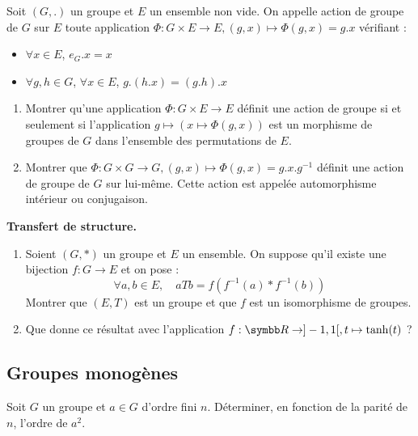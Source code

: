 \begin{exercice}
    Soit $(G,.)$ un groupe et $E$ un ensemble non vide.
    On appelle action de groupe de $G$ sur $E$ toute application $\Phi: G\times E \to E, (g,x) \mapsto \Phi(g,x)=g.x$ vérifiant :
    \begin{itemize}
        \item $\forall x\in E$, $e_{G}.x=x$
        \item $\forall g,h\in G$, $\forall x\in E$, $g.(h.x)=(g.h).x$
    \end{itemize}
    \begin{enumerate}
        \item Montrer qu'une application $\Phi:G\times E\rightarrow E$ définit une action de groupe 
            si et seulement si l'application $g\mapsto(x\mapsto\Phi(g,x))$ est un morphisme de groupes de $G$ dans l'ensemble des permutations de $E$.
        \item Montrer que $\Phi: G\times G \to G, (g,x) \mapsto \Phi(g,x)=g.x.g^{-1}$ définit une action de groupe de $G$ sur lui-même. 
            Cette action est appelée automorphisme intérieur ou conjugaison.
    \end{enumerate}
\end{exercice}

\begin{exercice}
    \textbf{Transfert de structure.}
    \begin{enumerate}
        \item Soient $(G,*)$ un groupe et $E$ un ensemble. On suppose qu'il existe une bijection $f:G\rightarrow E$ et on pose :
            \[\forall a,b\in E, \quad a T b=f(f^{-1}(a)*f^{-1}(b))\]
            Montrer que $(E,T)$ est un groupe et que $f$ est un isomorphisme de groupes.
        \item Que donne ce résultat avec l'application $f: \R \to ]-1,1[, t \mapsto \tanh(t)$ ?
    \end{enumerate}
\end{exercice}

\subsection{Groupes monogènes}
\begin{exercice}
    Soit $G$ un groupe et $a\in G$ d'ordre fini $n$.
    Déterminer, en fonction de la parité de $n$, l'ordre de $a^{2}$.
\end{exercice}

